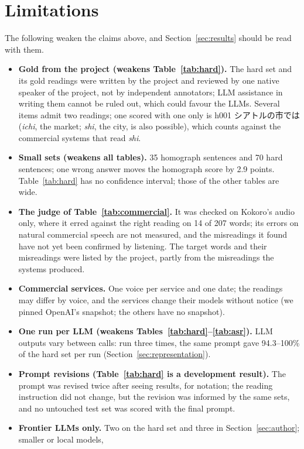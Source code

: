 \documentclass[11pt,a4paper]{article}
\begin{document}
\section{Limitations}\label{sec:limits}

The following weaken the claims above, and Section~\ref{sec:results} should be read with them.
\begin{itemize}
  \item \textbf{Gold from the project (weakens Table~\ref{tab:hard}).} The hard set and its gold readings were written by
  the project and reviewed by one native speaker of the project, not by independent annotators; LLM assistance in writing them cannot be
  ruled out, which could favour the LLMs. Several items admit two readings; one scored with one only is h001
  シアトルの市では (\emph{ichi}, the market; \emph{shi}, the city, is also possible), which counts against the
  commercial systems that read \emph{shi}.
  \item \textbf{Small sets (weakens all tables).} 35 homograph sentences and 70 hard sentences; one wrong answer moves
  the homograph score by 2.9 points. Table~\ref{tab:hard} has no confidence interval; those of the
  other tables are wide.
  \item \textbf{The judge of Table~\ref{tab:commercial}.} It was checked on Kokoro's audio only, where it erred against
  the right reading on 14 of 207 words; its errors on natural commercial speech are not measured, and the misreadings it
  found have not yet been confirmed by listening. The target words and their misreadings were listed by the project,
  partly from the misreadings the systems produced.
  \item \textbf{Commercial services.} One voice per service and one date; the readings may differ by voice, and the
  services change their models without notice (we pinned OpenAI's snapshot; the others have no snapshot).
  \item \textbf{One run per LLM (weakens Tables~\ref{tab:hard}--\ref{tab:asr}).} LLM outputs vary between calls:
  run three times, the same prompt gave 94.3--100\% of the hard set per run (Section~\ref{sec:representation}).
  \item \textbf{Prompt revisions (Table~\ref{tab:hard} is a development result).} The prompt was revised twice after
  seeing results, for notation; the reading instruction did not change, but the revision was informed by the same sets,
  and no untouched test set was scored with the final prompt.
  \item \textbf{Frontier LLMs only.} Two on the hard set and three in Section~\ref{sec:author}; smaller or local models,

\end{itemize}
\end{document}

